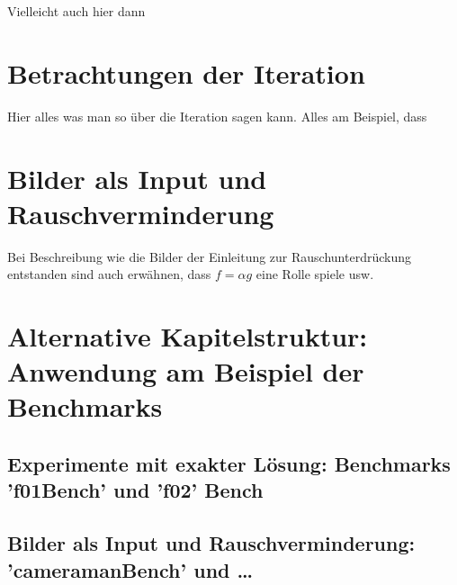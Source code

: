 \bigskip

Vielleicht auch hier dann

\section{Betrachtungen der Iteration}

Hier alles was man so über die Iteration sagen kann. Alles am Beispiel, dass

\section{Bilder als Input und Rauschverminderung}

Bei Beschreibung wie die Bilder der Einleitung zur Rauschunterdrückung
entstanden sind auch erwähnen, dass $f=\alpha g$ eine Rolle spiele usw.

\section{Alternative Kapitelstruktur: Anwendung am Beispiel der Benchmarks}
\subsection{Experimente mit exakter Lösung: Benchmarks 'f01Bench' und 'f02'
Bench}

\subsection{Bilder als Input und Rauschverminderung: 'cameramanBench' und
\ldots}

